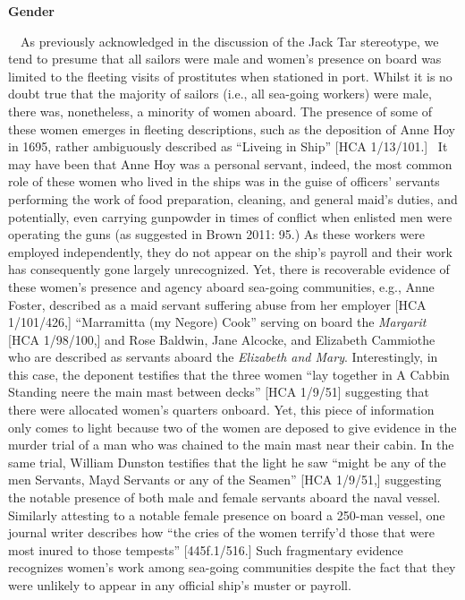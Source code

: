 \setcounter{listWWNumxviileveli}{2}
\begin{listWWNumxviileveli}
\item 

\setcounter{listWWNumxviilevelii}{2}
\begin{listWWNumxviilevelii}
\item 
\begin{styleListParagraph}
\textbf{Gender}
\end{styleListParagraph}
\end{listWWNumxviilevelii}
\end{listWWNumxviileveli}
\begin{styleStandard}
\ \ As previously acknowledged in the discussion of the Jack Tar stereotype, we tend to presume that all sailors were male and women’s presence on board was limited to the fleeting visits of prostitutes when stationed in port. Whilst it is no doubt true that the majority of sailors (i.e., all sea-going workers) were male, there was, nonetheless, a minority of women aboard. The presence of some of these women emerges in fleeting descriptions, such as the deposition of Anne Hoy in 1695, rather ambiguously described as “Liveing in Ship” [HCA 1/13/101.] \ It may have been that Anne Hoy was a personal servant, indeed, the most common role of these women who lived in the ships was in the guise of officers’ servants performing the work of food preparation, cleaning, and general maid’s duties, and potentially, even carrying gunpowder in times of conflict when enlisted men were operating the guns (as suggested in Brown 2011: 95.) As these workers were employed independently, they do not appear on the ship’s payroll and their work has consequently gone largely unrecognized. Yet, there is recoverable evidence of these women’s presence and agency aboard sea-going communities, e.g., Anne Foster, described as a maid servant suffering abuse from her employer [HCA 1/101/426,] “Marramitta (my Negore) Cook” serving on board the \textit{Margarit} [HCA 1/98/100,] and Rose Baldwin, Jane Alcocke, and Elizabeth Cammiothe who are described as servants aboard the \textit{Elizabeth and Mary}. Interestingly, in this case, the deponent testifies that the three women “lay together in A Cabbin Standing neere the main mast between decks” [HCA 1/9/51] suggesting that there were allocated women’s quarters onboard. Yet, this piece of information only comes to light because two of the women are deposed to give evidence in the murder trial of a man who was chained to the main mast near their cabin. In the same trial, William Dunston testifies that the light he saw “might be any of the men Servants, Mayd Servants or any of the Seamen” [HCA 1/9/51,] suggesting the notable presence of both male and female servants aboard the naval vessel. Similarly attesting to a notable female presence on board a 250-man vessel, one journal writer describes how “the cries of the women terrify’d those that were most inured to those tempests” [445f.1/516.] Such fragmentary evidence recognizes women’s work among sea-going communities despite the fact that they were unlikely to appear in any official ship’s muster or payroll. 
\end{styleStandard}

